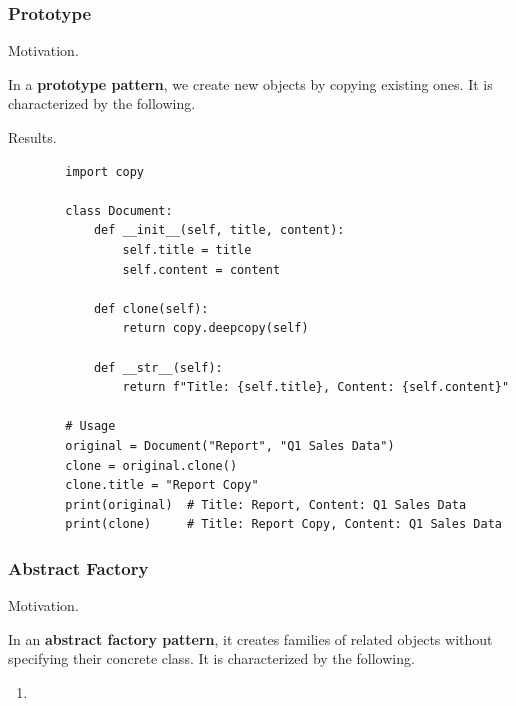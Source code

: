   \subsubsection{Prototype} 

    Motivation. 

    \begin{definition}
      \label{def:prototype-pattern}
      In a \textbf{prototype pattern}, we create new objects by copying existing ones. It is characterized by the following. 
    \end{definition}

    Results. 

    \begin{example}[Document]
      \label{ex:document}
      \begin{lstlisting}
        import copy

        class Document:
            def __init__(self, title, content):
                self.title = title
                self.content = content
            
            def clone(self):
                return copy.deepcopy(self)
            
            def __str__(self):
                return f"Title: {self.title}, Content: {self.content}"

        # Usage
        original = Document("Report", "Q1 Sales Data")
        clone = original.clone()
        clone.title = "Report Copy"
        print(original)  # Title: Report, Content: Q1 Sales Data
        print(clone)     # Title: Report Copy, Content: Q1 Sales Data 
      \end{lstlisting}
    \end{example}

  \subsubsection{Abstract Factory}

    Motivation. 

    \begin{definition}
      \label{def:abstract-factory-pattern}
      In an \textbf{abstract factory pattern}, it creates families of related objects without specifying their concrete class. It is characterized by the following. 
      \begin{enumerate}
        \item 
      \end{enumerate}
    \end{definition}

